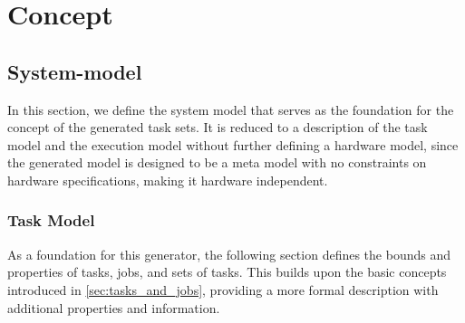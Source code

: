 \chapter{Concept}\label{ch:concept}
\section{System-model}\label{sec:model}
In this section, we define the system model that serves as the foundation for the concept of the generated task sets.
It is reduced to a description of the task model and the execution model without further defining a hardware model, since the generated model is designed to be a meta model with no constraints on hardware specifications, making it hardware independent.

\subsection{Task Model}\label{sec:task_model}
As a foundation for this generator, the following section defines the bounds and properties of tasks, jobs, and sets of tasks. This builds upon the basic concepts introduced in \cref{sec:tasks_and_jobs}, providing a more formal description with additional properties and information.

